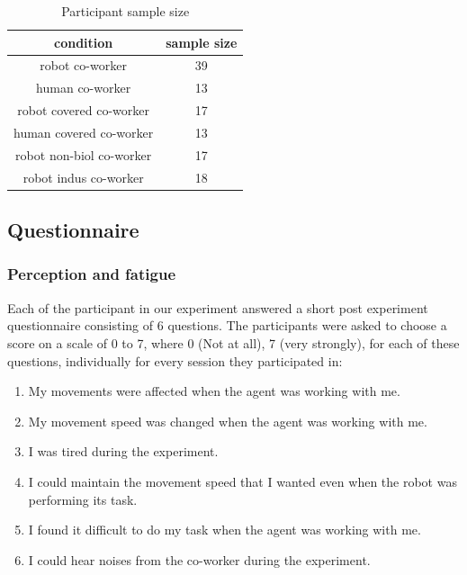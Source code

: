 \documentclass[a4paper, 12pt, oneside]{Thesis}  %
\begin{document}
\begin{table}[hpt]
	\caption{Participant sample size}
	\label{sizeTable}
	\begin{center}
		\begin{tabular}{|c c|}
			\hline  
			{\bf condition} &  {\bf sample size} \\ 
			\hline
			robot co-worker & 39 \\ 
			\hline
			human co-worker & 13 \\
			\hline
			robot covered co-worker & 17 \\
			\hline
			human covered co-worker & 13 \\
			\hline
			robot non-biol co-worker & 17 \\
			\hline
			robot indus co-worker & 18 \\
			\hline 			
		\end{tabular} 
	\end{center}
\end{table}


\subsection{Questionnaire}

\subsubsection{Perception and fatigue}

Each of the participant in our experiment answered a short post experiment questionnaire consisting of 6 questions. The participants were asked to choose a score on a scale of 0 to 7, where 0 (Not at all), 7 (very strongly), for each of these questions, individually for every session they participated in:

\begin{enumerate}[start=1,label={Q\arabic*.}]
	\item My movements were affected when the agent was working with me.
	\item My movement speed was changed when the agent was working with me.
	\item I was tired during the experiment.
	\item I could maintain the movement speed that I wanted even when the robot was performing its task.
	\item I found it difficult to do my task when the agent was working with me.
	\item I could hear noises from the co-worker during the experiment.
\end{enumerate}
\end{document}
